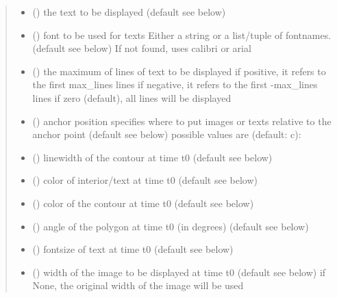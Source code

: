 \documentclass[letterpaper,10pt,english]{sphinxmanual}
\begin{document}
\begin{fulllineitems}
\begin{fulllineitems}
\begin{quote}
\begin{description}
\begin{itemize}
\item {} 
 () \textendash{} the text to be displayed (default see below)

\item {} 
 () \textendash{} font to be used for texts 
Either a string or a list/tuple of fontnames. (default see below)
If not found, uses calibri or arial

\item {} 
 () \textendash{} the maximum of lines of text to be displayed 
if positive, it refers to the first max\_lines lines 
if negative, it refers to the first -max\_lines lines 
if zero (default), all lines will be displayed

\item {} 
 () \textendash{} anchor position 
specifies where to put images or texts relative to the anchor
point (default see below) 
possible values are (default: c): 

\item {} 
 () \textendash{} linewidth of the contour at time t0 (default see below)

\item {} 
 () \textendash{} color of interior/text at time t0 (default see below)

\item {} 
 () \textendash{} color of the contour at time t0 (default see below)

\item {} 
 () \textendash{} angle of the polygon at time t0 (in degrees) (default see below)

\item {} 
 () \textendash{} fontsize of text at time t0 (default see below)

\item {} 
 () \textendash{} width of the image to be displayed at time t0 (default see below) 
if None, the original width of the image will be used


\end{itemize}
\end{description}
\end{quote}
\end{fulllineitems}
\end{fulllineitems}
\end{document}
